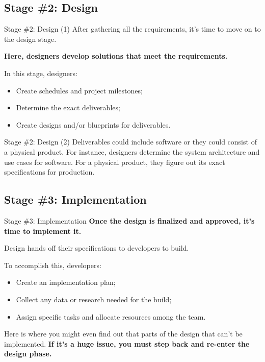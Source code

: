 \documentclass[
    notheorems,
    11pt,
    compress,
    aspectratio=169
]{beamer}
\begin{document}

\subsection{Stage \#2: Design}

\begin{frame}{Stage \#2: Design (1)}
    After gathering all the requirements, it’s time to move on to the design stage.

    \textbf{Here, designers develop solutions that meet the requirements.}

    \pause
    \vspace{\baselineskip}

    In this stage, designers:

    \begin{itemize}
        \item Create schedules and project milestones;
        \item Determine the exact deliverables;
        \item Create designs and/or blueprints for deliverables.
    \end{itemize}
\end{frame}

\begin{frame}{Stage \#2: Design (2)}
    Deliverables could include software or they could consist of a physical product. For instance, designers determine the system architecture and use cases for software. For a physical product, they figure out its exact specifications for production.
\end{frame}


\subsection{Stage \#3: Implementation}

\begin{frame}{Stage \#3: Implementation}
    \textbf{Once the design is finalized and approved, it’s time to implement it.}

    Design hands off their specifications to developers to build.

    \pause
    \vspace{\baselineskip}

    To accomplish this, developers:

    \begin{itemize}
        \item Create an implementation plan;
        \item Collect any data or research needed for the build;
        \item Assign specific tasks and allocate resources among the team.
    \end{itemize}

    \pause
    \vspace{\baselineskip}

    Here is where you might even find out that parts of the design that can’t be implemented.
    \textbf{If it’s a huge issue, you must step back and re-enter the design phase.}
\end{frame}
\end{document}
